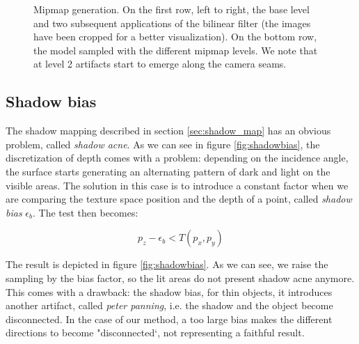 \begin{figure}
{  \label{fig:jemip1}
} 
\caption{Mipmap generation. On the first row, left to right, the base level and two subsequent applications of the bilinear filter (the images have been cropped for a better visualization). On the bottom row, the model sampled with the different mipmap levels. We note that at level 2 artifacts start to emerge along the camera seams.}
\label{fig:mipmaps}
\end{figure}


\subsection{Shadow bias}

The shadow mapping described in section \ref{sec:shadow_map} has an obvious problem, called \emph{shadow acne}. As we can see in figure \ref{fig:shadowbias}, the discretization of depth comes with a problem: depending on the incidence angle, the surface starts generating an alternating pattern of dark and light on the visible areas. The solution in this case is to introduce a constant factor when we are comparing the texture space position and the depth of a point, called \emph{shadow bias} $\epsilon_b$. The test then becomes:

$$
p_z - \epsilon_b < T(p_x,p_y)
$$ 

The result is depicted in figure \ref{fig:shadowbias}. As we can see, we raise the sampling by the bias factor, so the lit areas do not present shadow acne anymore. This comes with a drawback: the shadow bias, for thin objects, it introduces another artifact, called \emph{peter panning}, i.e. the shadow and the object become disconnected. In the case of our method, a too large bias makes the different directions to become "disconnected`, not representing a faithful result. 

